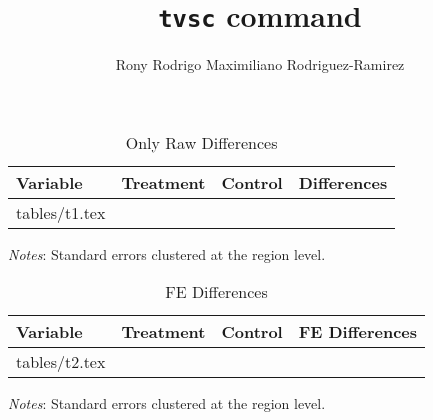 \documentclass[a4paper]{article}
\makeatletter
\newcommand\primitiveinput[1]
{\@@input #1 }
\makeatother
\begin{document}
\title{\texttt{tvsc} command}
\author{Rony Rodrigo Maximiliano Rodriguez-Ramirez}
\date{}
\maketitle

\newpage 

\begin{table}[H]
    \singlespacing
    \small
    \centering 
    \begin{adjustbox}{max width=\textwidth}
      \begin{threeparttable}
        \caption{Only Raw Differences}
        \label{tab:table1}
        \begin{tabular}[t]{@{}lccc}
            \toprule
            Variable & Treatment & Control & Differences \\
            \midrule 
            \addlinespace
            \primitiveinput{tables/t1.tex}
            \bottomrule
        \end{tabular}
        \begin{tablenotes}
            \setlength{}
            \footnotesize
            \item \textit{Notes}: Standard errors clustered at the region level.
        \end{tablenotes}
      \end{threeparttable}
   \end{adjustbox}
 \end{table}
 \begin{table}[H]
    \singlespacing
    \small
    \centering 
    \begin{adjustbox}{max width=\textwidth}
      \begin{threeparttable}
        \caption{FE Differences}
        \label{tab:table2}
        \begin{tabular}[t]{@{}lccc}
            \toprule
            Variable & Treatment & Control & FE Differences \\
            \midrule 
            \addlinespace
            \primitiveinput{tables/t2.tex}
            \bottomrule
        \end{tabular}
        \begin{tablenotes}
            \setlength{}
            \footnotesize
            \item \textit{Notes}: Standard errors clustered at the region level.
        \end{tablenotes}
      \end{threeparttable}
   \end{adjustbox}
 \end{table}
\end{document}
